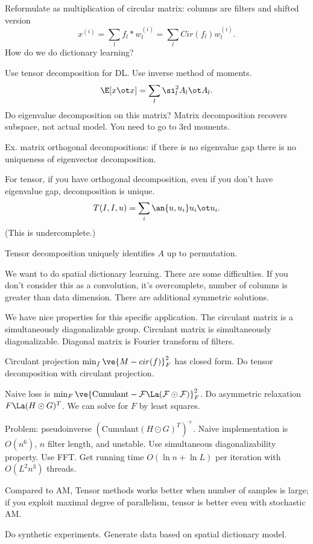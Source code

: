 Reformulate as multiplication of circular matrix: columns are filters and shifted version
$$
x^{(i)} = \sum_l f_l *w_l^{(i)} = \sum_l Cir(f_l) w_l^{(i)}.
$$
How do we do dictionary learning?

Use tensor decomposition for DL. 
Use inverse method of moments. 
$$
\E[x\ot x] = \sum_l \si_l^2 A_l\ot A_l.
$$
Do eigenvalue decomposition on this matrix? Matrix decomposition recovers subspace, not actual model. You need to go to 3rd moments. 

Ex. matrix orthogonal decompositions: if there is no eigenvalue gap there is no uniqueness of eigenvector decomposition.

For tensor, if you have orthogonal decomposition, even if you don't have eigenvalue gap, decomposition is unique.
$$
T(I,I,u) = \sum_i \an{u,u_i}u_i\ot u_i. 
$$
(This is undercomplete.)

Tensor decomposition uniquely identifies $A$ up to permutation.

We want to do spatial dictionary learning. There are some difficulties. If you don't consider this as a convolution, it's overcomplete, number of columns is greater than data dimension. There are additional symmetric solutions.

We have nice properties for this specific application. The circulant matrix is a simultaneously diagonalizable group. Circulant matrix is simultaneously diagonalizable. Diagonal matrix is Fourier transform of filters. 

Circulant projection $\min_f \ve{M-cir(f)}_F^2$ has closed form. 
Do tensor decomposition with circulant projection.

Naive loss is $\min_F \ve{\text{Cumulant} - \cal F \La (\cal F\odot \cal F)}_F^2$. Do asymmetric relaxation $F\La (H\odot G)^T$. We can solve for $F$ by least squares. 

Problem: pseudoinverse $(\text{Cumulant}(H\odot G)^T)^+$. Naive implementation is $O(n^6)$, $n$ filter length, and unstable. Use simultaneous diagonalizability property.  Use FFT. Get running time $O(\ln n + \ln L)$ per iteration with $O(L^2 n^3)$ threads.

Compared to AM, Tensor methods works  better when number of samples is large; if you exploit maximal degree of parallelism, tensor is better even with stochastic AM. 

Do synthetic experiments. Generate data based on spatial dictionary model.

